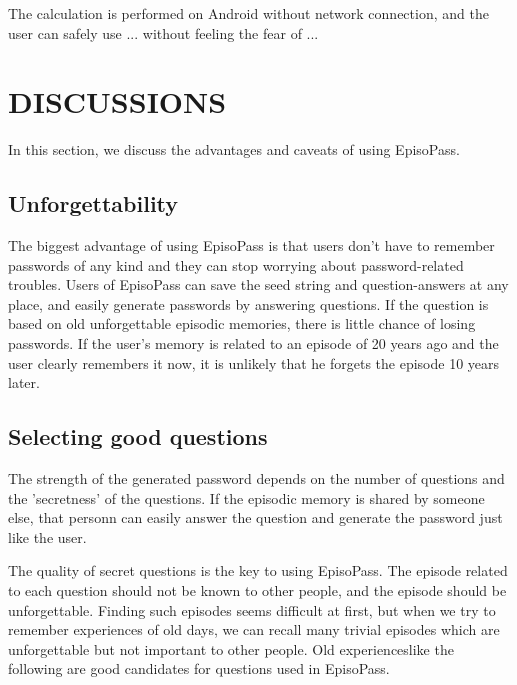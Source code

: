 \documentclass{article}
\begin{document}
The calculation is performed on Android without network connection,
and the user can safely use ...
without feeling the fear of ...


\section{DISCUSSIONS}

In this section, we discuss the advantages and caveats of
using EpisoPass.

\subsection{Unforgettability}

The biggest advantage of using EpisoPass is that
users don't have to remember passwords of any kind and
they can stop worrying about password-related troubles.
%
Users of EpisoPass can save the seed string and question-answers
at any place, and easily generate passwords by answering questions.
If the question is based on old unforgettable episodic memories,
there is little chance of losing passwords.
If the user's memory is related to an episode of 20 years ago and the user clearly
remembers it now, it is unlikely that he forgets the episode 10 years later.

\subsection{Selecting good questions}


The strength of the generated password depends on the number of
questions and the 'secretness' of the questions.
If the episodic memory is shared by someone else,
that personn can easily answer the question and generate the
password just like the user.

The quality of secret questions is the key to using EpisoPass.
The episode related to each question should not be known to other people,
and the episode should be unforgettable.
%
Finding such episodes seems difficult at first, but
when we try to remember experiences of old days,
we can recall many trivial episodes which are unforgettable but
not important to other people.
%
Old experienceslike the following are good candidates for
questions used in EpisoPass.
\end{document}
